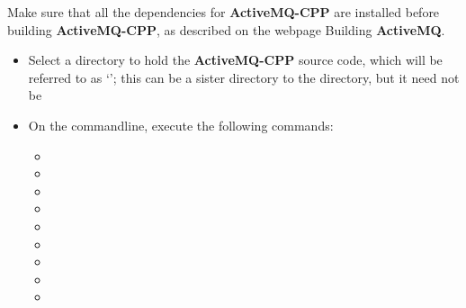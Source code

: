 Make sure that all the dependencies for \textbf{ActiveMQ-CPP} are installed before
building \textbf{ActiveMQ-CPP}, as described on the web\longDash{}page
%
{Building \textbf{ActiveMQ}}.
\begin{itemize}
\item Select a directory to hold the \textbf{ActiveMQ-CPP} source code, which will be
referred to as `'; this can be a sister directory to the
 directory, but it need not be
\item\exSp{}On the command\longDash{}line, execute the following commands:
\begin{itemize}
\item{}
\item\exSp{}
\item\exSp{}
\item\exSp{}
\item\exSp{}
\item\exSp{}
\item\exSp{}
\item\exSp{}
\item\exSp{}
\end{itemize}
\end{itemize}
\tertiaryEnd
{}

